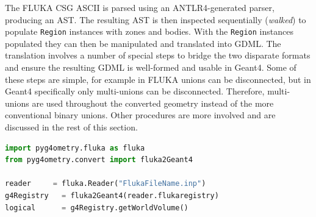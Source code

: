 \documentclass[final,5p,times,twocolumn]{elsarticle}
\newcommand{\pyinline}[1]{\lstinline[postbreak={}]{#1}}
\newcommand{\PYGEOMETRY}{\textsc{Pyg4ometry}}
\begin{document}
The FLUKA CSG ASCII is parsed using an ANTLR4-generated parser,
producing an AST.  The resulting AST is then inspected sequentially
(\emph{walked}) to populate \pyinline{Region} instances with zones and bodies.
With the \pyinline{Region} instances populated they can then be manipulated
and translated into GDML.  The translation involves a number of special
steps to bridge the two disparate formats and ensure the resulting GDML is
well-formed and usable in Geant4.  Some of these steps are simple, for
example in FLUKA unions can be disconnected, but in Geant4 specifically
only multi-unions can be disconnected.  Therefore, multi-unions are used
throughout the converted geometry instead of the more conventional binary unions.
Other procedures are more involved and are discussed in the rest of this
section.

\begin{lstlisting}[caption={A simple \PYGEOMETRY{} Python script to load a
    FLUKA file and convert its geometry to a Geant4 logical volume.},label={lst:pythonFlukaLoading}, language=Python]
import pyg4ometry.fluka as fluka
from pyg4ometry.convert import fluka2Geant4

reader     = fluka.Reader("FlukaFileName.inp")
g4Registry   = fluka2Geant4(reader.flukaregistry)
logical      = g4Registry.getWorldVolume()
\end{lstlisting}
\end{document}
